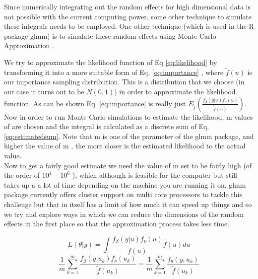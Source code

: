 \documentclass{article}
\begin{document}
Since numerically integrating out the random effects for high dimensional data is not possible with the current computing power, some other technique to simulate these integrals needs to be employed. One other technique (which is used in the R package glmm) is to simulate these random effects using Monte Carlo Approximation .

We try to approximate the likelihood function of Eq \ref{eq:likelihood} by transforming it into a more suitable form of Eq. \ref{eq:importance} , where $\tilde{f}(u)$ is our importance sampling distribution. This is a distribution that we choose (in our case it turns out to be $N(0,1)$) in order to approximate the likelihood function. As can be shown Eq. \ref{eq:importance} is really just $E_{\tilde{f}}(\frac{f_\beta(y|u)f_\nu(u)}{\tilde{f}(u)})$. Now in order to run Monte Carlo simulations to estimate the likelihood, m values of  are chosen and the integral is calculated as a discrete sum of Eq. \ref{eq:estimatedsum}. Note that m is one of the parameter of the glmm package, and higher the value of m , the more closer is the estimated likelihood to the actual value. \\ 
Now to get a fairly good estimate we need the value of m set to be fairly high (of the order of $10^4 - 10^6$ ), which although is feasible for the computer but still takes up a a lot of time depending on the machine you are running it on. glmm package currently offers cluster support on multi core processors to tackle this challenge but that in itself has a limit of how much it can speed up things and so we try and explore ways in which we can reduce the dimensions of the random effects in the first place so that the approximation process takes less time. 

\begin{equation}
L(\theta{}|y) = \int \frac{f_\beta(y|u)f_\nu(u)}{\tilde{f}(u)}\tilde{f}(u)du
\label{eq:importance}
\end{equation}
\begin{equation}
 \frac{1}{m} \sum\limits_{k=1}^m \frac{f_\beta(y|u_k)f_\nu(u_k)}{\tilde{f}(u_k)} =   \frac{1}{m} \sum\limits_{k=1}^m \frac{f_\theta(y,u_k)}{\tilde{f}(u_k)} 
\label{eq:estimatedsum}
\end{equation}
\end{document}
